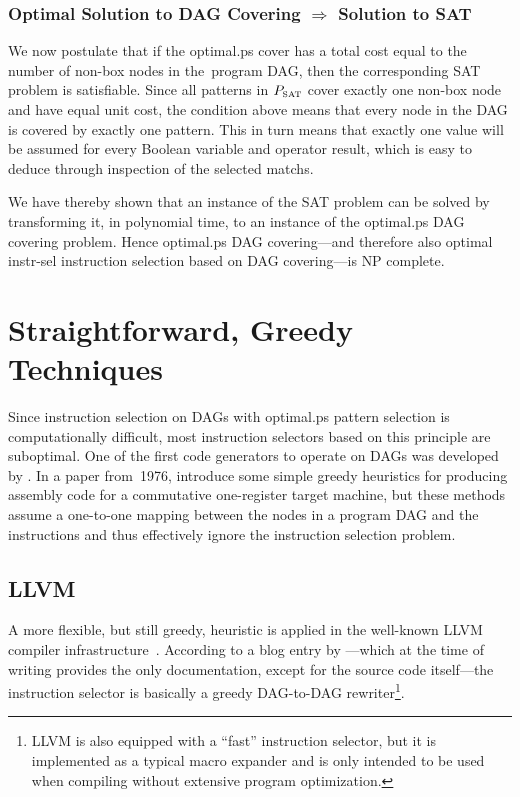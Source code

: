 \subsubsection{Optimal Solution to DAG Covering $\Rightarrow$ Solution to SAT}

We now postulate that if the \gls{optimal.ps} cover has a total cost equal
to the number of non-\glspl{box node} in the~\gls{program DAG}, then the
corresponding \gls{SAT problem} is satisfiable.
%
Since all \glspl{pattern} in
$\mPSat$ cover exactly one non-\gls{box node} and have equal unit cost, the
condition above means that every \gls{node} in the \gls{DAG} is covered by
exactly one \gls{pattern}.
%
This in turn means that exactly one value will be
assumed for every Boolean variable and operator result, which is easy to deduce
through inspection of the selected \glspl{match}.

We have thereby shown that an instance of the \gls{SAT problem} can be solved by
transforming it, in polynomial time, to an instance of the \gls{optimal.ps}
\gls{DAG covering} problem.
%
Hence \gls{optimal.ps} \gls{DAG covering}---and
therefore also \gls{optimal instr-sel} \gls{instruction selection} based on
\gls{DAG covering}---is \gls{NP complete}.
%
\hfill\qedsymbol


\section{Straightforward, Greedy Techniques}

Since \gls{instruction selection} on \glspl{DAG} with \gls{optimal.ps}
\gls{pattern selection} is computationally difficult, most \glspl{instruction
  selector} based on this \gls{principle} are suboptimal.
%
One of the first
\glspl{code generator} to operate on \glspl{DAG} was developed by
\textcite{Aho1976b}.
%
In a paper from~1976, \citeauthor{Aho1976b} introduce some
simple greedy heuristics for producing \gls{assembly code} for a commutative
one-\gls{register} \gls{target machine}, but these methods assume a one-to-one
mapping between the \glspl{node} in a \gls{program DAG} and the
\glspl{instruction} and thus effectively ignore the \gls{instruction selection}
problem.


\subsection{LLVM}

A more flexible, but still greedy, heuristic is applied in the well-known
\gls{LLVM} \gls{compiler} infrastructure~\cite{Lattner2004}.
%
According to a blog
entry by \textcite{Bendersky2013}\unskip%
%
---which at the time of writing provides the only documentation, except for
the source code itself---the \gls{instruction selector} is basically a greedy
\mbox{\gls{DAG}-to-\gls{DAG}} rewriter\footnote{\gls{LLVM} is also equipped with
  a ``fast'' \gls{instruction selector}, but it is implemented as a typical
  \gls{macro expander} and is only intended to be used when compiling without
  extensive \gls{program} optimization.}.


